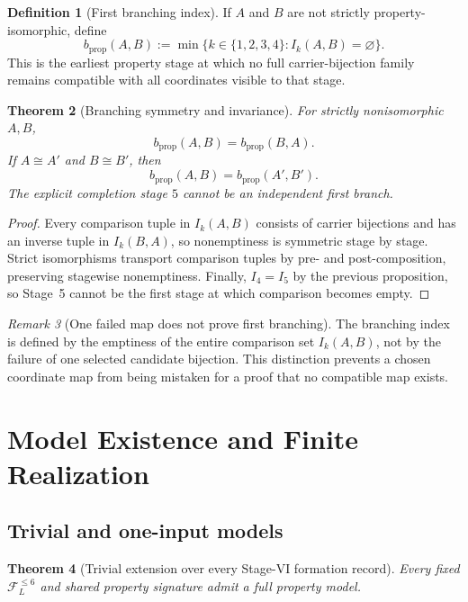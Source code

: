 \documentclass[11pt]{article}
\newcommand{\FVI}{\mathcal F_{L}^{\le 6}}
\newtheorem{theorem}{Theorem}[section]
\theoremstyle{definition}
\newtheorem{definition}[theorem]{Definition}
\theoremstyle{remark}
\newtheorem{remark}[theorem]{Remark}
\begin{document}
\begin{definition}[First branching index]
If \(A\) and \(B\) are not strictly property-isomorphic, define
\[
b_{\mathrm{prop}}(A,B):=
\min\{k\in\{1,2,3,4\}:I_k(A,B)=\varnothing\}.
\]
This is the earliest property stage at which no full carrier-bijection family remains compatible with all coordinates visible to that stage.
\end{definition}

\begin{theorem}[Branching symmetry and invariance]
\label{thm:branching-invariance}
For strictly nonisomorphic \(A,B\),
\[
b_{\mathrm{prop}}(A,B)=b_{\mathrm{prop}}(B,A).
\]
If \(A\cong A'\) and \(B\cong B'\), then
\[
b_{\mathrm{prop}}(A,B)=b_{\mathrm{prop}}(A',B').
\]
The explicit completion stage \(5\) cannot be an independent first branch.
\end{theorem}

\begin{proof}
Every comparison tuple in \(I_k(A,B)\) consists of carrier bijections and has an inverse tuple in \(I_k(B,A)\), so nonemptiness is symmetric stage by stage.
Strict isomorphisms transport comparison tuples by pre- and post-composition, preserving stagewise nonemptiness.
Finally, \(I_4=I_5\) by the previous proposition, so Stage~5 cannot be the first stage at which comparison becomes empty.
\end{proof}

\begin{remark}[One failed map does not prove first branching]
The branching index is defined by the emptiness of the entire comparison set \(I_k(A,B)\), not by the failure of one selected candidate bijection.
This distinction prevents a chosen coordinate map from being mistaken for a proof that no compatible map exists.
\end{remark}

\section{Model Existence and Finite Realization}
\label{sec:finite}

\subsection{Trivial and one-input models}

\begin{theorem}[Trivial extension over every Stage-VI formation record]
\label{thm:trivial-extension}
Every fixed \(\FVI\) and shared property signature admit a full property model.
\end{theorem}
\end{document}
